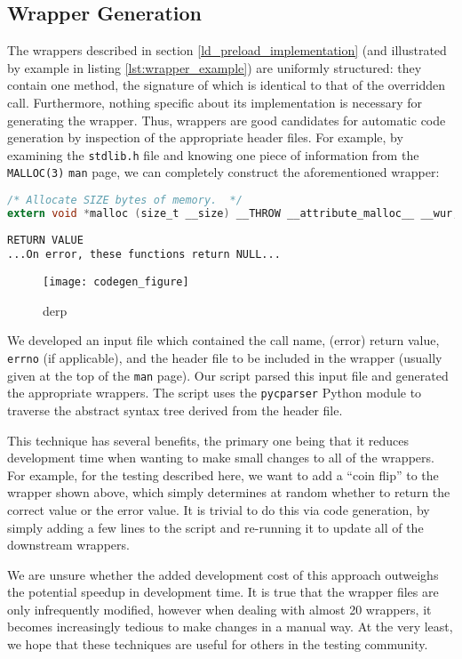 \subsection{Wrapper Generation}
The wrappers described in section \ref{ld_preload_implementation} (and illustrated by example in listing \ref{lst:wrapper_example}) are uniformly structured: they contain one method, the signature of which is identical to that of the overridden call. Furthermore, nothing specific about its implementation is necessary for generating the wrapper. Thus, wrappers are good candidates for automatic code generation by inspection of the appropriate header files. For example, by examining the \texttt{stdlib.h} file and knowing one piece of information from the \texttt{MALLOC(3)} \texttt{man} page, we can completely construct the aforementioned wrapper:

\begin{lstlisting}[caption=Excerpt from \texttt{/usr/include/stdlib.h}, language=C]
/* Allocate SIZE bytes of memory.  */
extern void *malloc (size_t __size) __THROW __attribute_malloc__ __wur;
\end{lstlisting}

\begin{lstlisting}[caption=Excerpt from \texttt{MALLOC(3)}]
RETURN VALUE
...On error, these functions return NULL...
\end{lstlisting}

\begin{figure}[h]
\centering
\texttt{[image: codegen\_figure]}
\caption{derp}
\label{derp}
\end{figure}

We developed an input file which contained the call name, (error) return value, \texttt{errno} (if applicable), and the header file to be included in the wrapper (usually given at the top of the \texttt{man} page). Our script parsed this input file and generated the appropriate wrappers. The script uses the \texttt{pycparser} Python module \cite{pycparser} to traverse the abstract syntax tree derived from the header file.

This technique has several benefits, the primary one being that it reduces development time when wanting to make small changes to all of the wrappers. For example, for the testing described here, we want to add a ``coin flip'' to the wrapper shown above, which simply determines at random whether to return the correct value or the error value. It is trivial to do this via code generation, by simply adding a few lines to the script and re-running it to update all of the downstream wrappers.

We are unsure whether the added development cost of this approach outweighs the potential speedup in development time. It is true that the wrapper files are only infrequently modified, however when dealing with almost 20 wrappers, it becomes increasingly tedious to make changes in a manual way. At the very least, we hope that these techniques are useful for others in the testing community.